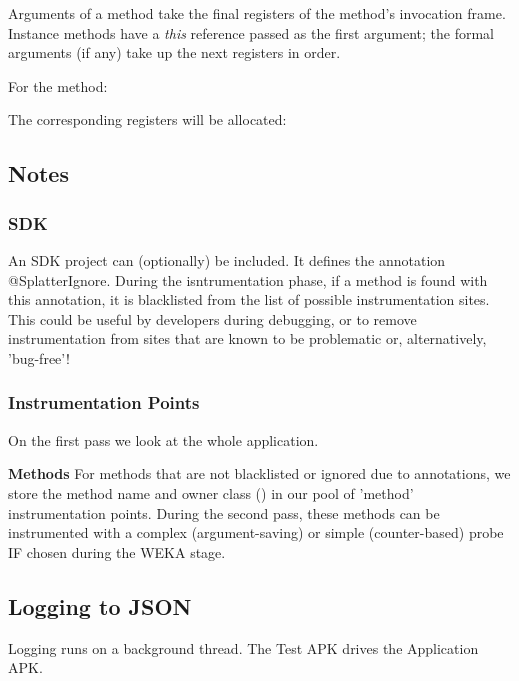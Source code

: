 Arguments of a method take the final registers of the method's invocation frame. Instance methods have a \textit{this} reference passed as the first argument; the formal arguments (if any) take up the next registers in order.

For the method:


The corresponding registers will be allocated:



\subsection{Notes}

\subsubsection{SDK}

An SDK project can (optionally) be included. It defines the annotation @SplatterIgnore. During the isntrumentation phase, if a method is found with this annotation, it is blacklisted from the list of possible instrumentation sites. This could be useful by developers during debugging, or to remove instrumentation from sites that are known to be problematic or, alternatively, 'bug-free'!

\subsubsection{Instrumentation Points}
On the first pass we look at the whole application.

\textbf{Methods}
For methods that are not blacklisted or ignored due to annotations, we store the method name and owner class () in our pool of 'method' instrumentation points. During the second pass, these methods can be instrumented with a complex (argument-saving) or simple (counter-based) probe IF chosen during the WEKA stage.

\subsection{Logging to JSON}

Logging runs on a background thread. The Test APK drives the Application APK.

